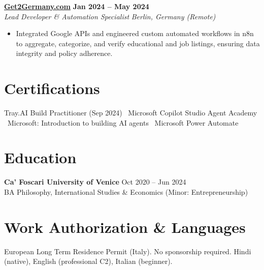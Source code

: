 \documentclass[a4paper,10pt]{article}
\newcommand{\role}[4]{%
 \textbf{#1} \hfill \textbf{#2}\\[1pt]%
 \textit{#3} \hfill \textit{#4}\\[1.5pt]%
}
\begin{document}
\role{\href{https://get2germany.com}{Get2Germany.com}}{Jan 2024 -- May 2024}{Lead Developer \& Automation Specialist}{Berlin, Germany (Remote)}
\begin{itemize}
 \item Integrated Google APIs and engineered custom automated workflows in n8n to aggregate, categorize, and verify educational and job listings, ensuring data integrity and policy adherence.
\end{itemize}

\section{Certifications}
Tray.AI Build Practitioner (Sep 2024) \textbullet\ Microsoft Copilot Studio Agent Academy \textbullet\ Microsoft: Introduction to building AI agents \textbullet\ Microsoft Power Automate

\section{Education}
\textbf{Ca' Foscari University of Venice} \hfill Oct 2020 -- Jun 2024\\
BA Philosophy, International Studies \& Economics (Minor: Entrepreneurship)

\section{Work Authorization \& Languages}
European Long Term Residence Permit (Italy). No sponsorship required. Hindi (native), English (professional C2), Italian (beginner).
\end{document}

